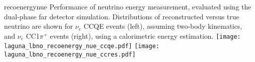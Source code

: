 \begin{cdrfigure}{recoenergynue}
{Performance of neutrino energy measurement, evaluated using the dual-phase far detector simulation. 
Distributions of reconstructed versus true neutrino are shown for $\nu_{e}$ CCQE events (left),
assuming two-body kinematics, and $\nu_{e}$  CC1$\pi^{+}$ events (right),
using a calorimetric energy estimation.}
\texttt{[image: laguna\_lbno\_recoenergy\_nue\_ccqe.pdf]}
\texttt{[image: laguna\_lbno\_recoenergy\_nue\_ccres.pdf]}
\end{cdrfigure}



